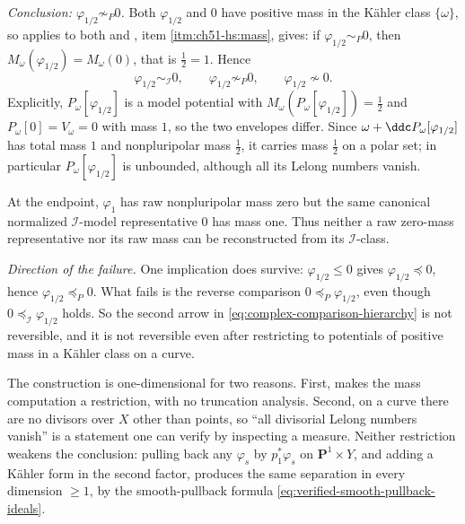 \begin{example}
\emph{Conclusion: \(\varphi_{1/2}\not\sim_P0\).}  Both
\(\varphi_{1/2}\) and \(0\)
have positive mass in the K\"ahler class \(\{\omega\}\), so
 applies to both and
, item \cref{itm:ch51-hs:mass}, gives:
if \(\varphi_{1/2}\sim_P0\), then
\(M_\omega(\varphi_{1/2})=M_\omega(0)\), that is \(\tfrac12=1\).  Hence
\[
 \varphi_{1/2}\sim_{\mathcal I}0,
 \qquad
 \varphi_{1/2}\not\sim_P0,
 \qquad
 \varphi_{1/2}\not\sim0 .
\]
Explicitly, \(P_\omega[\varphi_{1/2}]\) is a model potential with
\(M_\omega(P_\omega[\varphi_{1/2}])=\tfrac12\) and
\(P_\omega[0]=V_\omega=0\) with mass \(1\), so the two envelopes differ.
Since \(\omega+\ddc P_\omega[\varphi_{1/2}]\) has total mass \(1\) and
nonpluripolar mass \(\tfrac12\), it carries mass \(\tfrac12\) on a polar
set; in particular \(P_\omega[\varphi_{1/2}]\) is unbounded, although all its
Lelong numbers vanish.

At the endpoint, \(\varphi_1\) has raw nonpluripolar mass zero but the
same canonical normalized \(\mathcal I\)-model representative \(0\) has
mass one.  Thus neither a raw zero-mass representative nor its raw mass can
be reconstructed from its \(\mathcal I\)-class.

\emph{Direction of the failure.}  One implication does survive:
\(\varphi_{1/2}\leq0\) gives \(\varphi_{1/2}\preceq0\), hence
\(\varphi_{1/2}\preceq_P0\).  What fails is the reverse comparison
\(0\preceq_P\varphi_{1/2}\), even though
\(0\preceq_{\mathcal I}\varphi_{1/2}\) holds.
So the second arrow in \eqref{eq:complex-comparison-hierarchy} is not
reversible, and it is not reversible even after restricting to potentials
of positive mass in a K\"ahler class on a curve.
\end{example}

\begin{remark}
\label{rem:ch51-cantor-dimension}
The construction is one-dimensional for two reasons.  First,
 makes the mass computation a
restriction, with no truncation analysis.  Second, on a curve there are
no divisors over \(X\) other than points, so ``all divisorial Lelong
numbers vanish'' is a statement one can verify by inspecting a measure.
Neither restriction weakens the conclusion: pulling back any \(\varphi_s\)
by \(p_1^*\varphi_s\) on \(\mathbf P^1\times Y\), and
adding a K\"ahler form in the second factor, produces the same separation
in every dimension \(\geq1\), by the smooth-pullback formula
\eqref{eq:verified-smooth-pullback-ideals}.
\end{remark}

